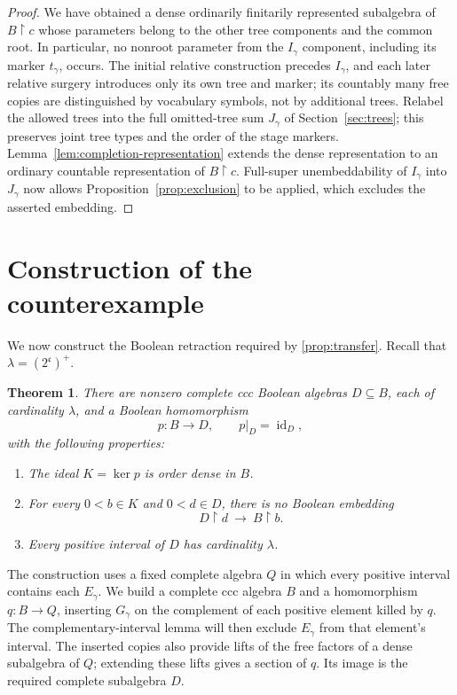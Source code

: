 \documentclass[11pt]{article}
\newtheorem{theorem}{Theorem}[section]
\theoremstyle{definition}
\theoremstyle{remark}
\newcommand{\restr}{\mathbin{\upharpoonright}}
\newcommand{\cc}{\mathfrak c}
\newcommand{\id}{\operatorname{id}}
\begin{document}
\begin{proof}
We have obtained a dense ordinarily finitarily represented subalgebra of
$B\restr c$ whose parameters belong to the other tree components and
the common root.  In particular, no nonroot parameter from the
$I_\gamma$ component, including its marker $t_\gamma$, occurs.
The initial relative construction precedes $I_\gamma$, and each later
relative surgery introduces only its own tree and marker; its countably
many free copies are distinguished by vocabulary symbols, not by
additional trees.
Relabel the allowed trees into the full omitted-tree sum $J_\gamma$ of
Section~\ref{sec:trees}; this preserves joint tree types and the order of
the stage markers.  Lemma~\ref{lem:completion-representation} extends
the dense representation to an ordinary countable representation of
$B\restr c$.  Full-super unembeddability of $I_\gamma$ into
$J_\gamma$ now allows Proposition~\ref{prop:exclusion} to be applied,
which excludes the asserted embedding.
\end{proof}

\section{Construction of the counterexample}\label{sec:construction}

We now construct the Boolean retraction required by
\cref{prop:transfer}. Recall that $\lambda=(2^\cc)^+$.

\begin{theorem}\label{thm:boolean}
There are nonzero complete ccc Boolean algebras $D\subseteq B$, each of
cardinality $\lambda$, and a Boolean homomorphism
\[
 p:B\longrightarrow D,\qquad p|_D=\id_D,
\]
with the following properties:
\begin{enumerate}
\item The ideal $K=\ker p$ is order dense in $B$.
\item For every $0<b\in K$ and $0<d\in D$, there is no Boolean embedding
\[
 D\restr d\ \longrightarrow\ B\restr b.
\]
\item Every positive interval of $D$ has cardinality $\lambda$.
\end{enumerate}
\end{theorem}

The construction uses a fixed complete algebra $Q$ in which every positive
interval contains each $E_\gamma$. We build a complete ccc algebra $B$
and a homomorphism $q:B\to Q$, inserting $G_\gamma$ on the complement
of each positive element killed by $q$. The complementary-interval lemma
will then exclude $E_\gamma$ from that element's interval. The inserted
copies also provide lifts of the free factors of a dense subalgebra of
$Q$; extending these lifts gives a section of $q$. Its image is the
required complete subalgebra $D$.
\end{document}
